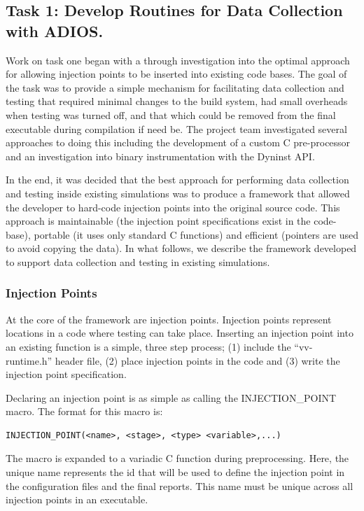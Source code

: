 \subsection{Task 1: Develop Routines for Data Collection with ADIOS. }

Work on task one began with a through investigation into the optimal approach for allowing injection points to be inserted 
into existing code bases. The goal of the task was to provide a simple mechanism for facilitating data collection and testing that required minimal changes to the build system, had small
overheads when testing was turned off, and that which could be removed from the final executable during compilation if need be. The project team investigated several approaches to doing this including
the development of a custom C pre-processor and an investigation into binary instrumentation with the Dyninst API.

In the end, it was decided that the best approach for performing \VV data collection and testing inside existing simulations was to produce a framework that allowed the
developer to hard-code injection points into the original source code. This approach is maintainable (the injection point specifications exist in the code-base), portable (it uses only
standard C functions) and efficient (pointers are used to avoid copying the data). In what follows, we describe the framework developed to support data collection and \VV testing 
in existing simulations. 

\subsubsection{Injection Points}

At the core of the framework are injection points. Injection points represent locations in a code where \VV testing can take place. Inserting an injection point into an existing function is a simple, three step process; (1) include the ``vv-runtime.h'' header file, (2) place injection points in the code and (3) write the injection point specification.

Declaring an injection point is as simple as calling the INJECTION\_POINT macro. The format for this macro is:

\begin{verbatim} 
INJECTION_POINT(<name>, <stage>, <type> <variable>,...)
\end{verbatim}

The macro is expanded to a variadic C function during preprocessing. Here, the unique name represents the id that will be used to define the injection point in the configuration files and the final reports. This name must be unique across all injection points in an executable. 

